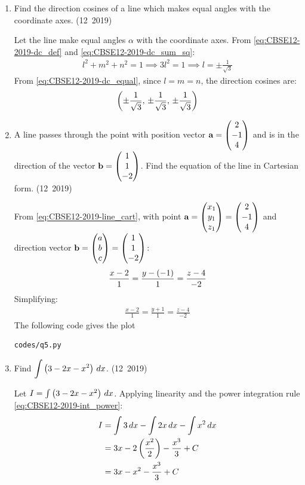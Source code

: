\begin{enumerate}[label=\thesubsection.\arabic*, ref=\thesubsection.\theenumi]
\item Find the direction cosines of a line which makes equal angles with the coordinate axes.
\hfill (12~2019)

\solution
Let the line make equal angles $\alpha$ with the coordinate axes. From \eqref{eq:CBSE12-2019-dc_def} and \eqref{eq:CBSE12-2019-dc_sum_sq}:
\begin{align}
	l^2 + m^2 + n^2 = 1 \implies 3l^2 = 1 \implies l = \pm\frac{1}{\sqrt{3}}
\end{align}
From \eqref{eq:CBSE12-2019-dc_equal}, since $l = m = n$, the direction cosines are:
\begin{align}
	\left(\pm\frac{1}{\sqrt{3}}, \, \pm\frac{1}{\sqrt{3}}, \, \pm\frac{1}{\sqrt{3}}\right)
\end{align}

\item A line passes through the point with position vector $\mathbf{a} = \begin{pmatrix}2 \\ -1 \\ 4\end{pmatrix}$ and is in the direction of the vector $\mathbf{b} = \begin{pmatrix}1 \\ 1 \\ -2\end{pmatrix}$. Find the equation of the line in Cartesian form.
\hfill (12~2019)

\solution
From \eqref{eq:CBSE12-2019-line_cart}, with point $\mathbf{a} = \begin{pmatrix}x_1 \\ y_1 \\ z_1\end{pmatrix} = \begin{pmatrix}2 \\ -1 \\ 4\end{pmatrix}$ and direction vector $\mathbf{b} = \begin{pmatrix}a \\ b \\ c\end{pmatrix} = \begin{pmatrix}1 \\ 1 \\ -2\end{pmatrix}$:
\begin{align}
	\frac{x - 2}{1} = \frac{y - \left(-1\right)}{1} = \frac{z - 4}{-2}
\end{align}
Simplifying:
\begin{align}
	\frac{x - 2}{1} = \frac{y + 1}{1} = \frac{z - 4}{-2}
\end{align}
The following code gives the plot
\begin{lstlisting}[frame=single, basicstyle=\ttfamily\small]
	codes/q5.py
\end{lstlisting}

\item Find $\displaystyle\int \left(3 - 2x - x^2\right)\,dx$.
\hfill (12~2019)

\solution
Let $I = \int \left(3 - 2x - x^2\right)\,dx$.
Applying linearity and the power integration rule \eqref{eq:CBSE12-2019-int_power}:
\begin{align}
	I &= \int 3\,dx - \int 2x\,dx - \int x^2\,dx \\
	&= 3x - 2\left(\frac{x^2}{2}\right) - \frac{x^3}{3} + C \\
	&= 3x - x^2 - \frac{x^3}{3} + C
\end{align}



\end{enumerate}
